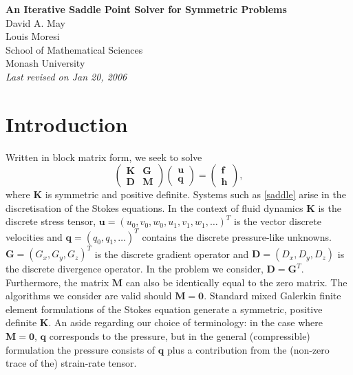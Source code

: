 \documentclass[a4paper]{article}
\begin{document}

\begin{center}
{\bf \LARGE{An Iterative Saddle Point Solver for Symmetric Problems}}\\
\vspace{4.0mm}
{\Large David A. May } \\
{\small Louis Moresi}\\
\vspace{4.0mm}
{\large School of Mathematical Sciences\\
Monash University } \\
\vspace{2.0mm}
{\it Last revised on Jan 20, 2006} \\
\end{center}


\section{Introduction}
Written in block matrix form, we seek to solve
\begin{equation}
\left( \begin{array}{cc}
 {\boldsymbol K}   & {\boldsymbol G} \\
 {\boldsymbol D}     & {\boldsymbol M}
\end{array} \right)
\left( \begin{array}{c}
{\boldsymbol u} \\
{\boldsymbol q}
\end{array} \right)
= \left( \begin{array}{c}
{\boldsymbol f} \\
{\boldsymbol h}
\end{array} \right),
\label{saddle}
\end{equation}
where ${\boldsymbol K}$ is symmetric and positive definite. Systems such as \eqref{saddle} arise in the discretisation of the Stokes equations. In the context of fluid dynamics  ${\boldsymbol K}$ is the discrete stress tensor, ${\boldsymbol u} = ( u_0, v_0, w_0, u_1, v_1, w_1, \dots )^T $ is the vector discrete velocities and ${\boldsymbol q} = (q_0, q_1, \dots)^T$ contains the discrete pressure-like unknowns. ${\boldsymbol G} = \left(  G_x, G_y, G_z  \right)^T $ is the discrete gradient operator and ${\boldsymbol D} = \left(  D_x , D_y , D_z  \right)$ is the discrete divergence operator. In the problem we consider, $ {\boldsymbol D} =  {\boldsymbol G}^T$. 
Furthermore, the matrix ${\boldsymbol M}$ can also be identically equal to the zero matrix. The algorithms we consider are valid should ${\boldsymbol M}={\boldsymbol 0}$. Standard mixed Galerkin finite element formulations of the Stokes equation generate a symmetric, positive definite ${\boldsymbol K}$. An aside regarding our choice of terminology: in the case where ${\boldsymbol M}={\boldsymbol 0}$, ${\boldsymbol q}$ corresponds to the pressure, but in the general (compressible) formulation the pressure consists of ${\boldsymbol q}$ plus a contribution from the (non-zero trace of the) strain-rate tensor.
\end{document}
